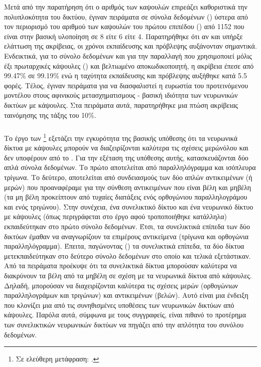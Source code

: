 Μετά από την παρατήρηση ότι ο αριθμός των καψουλών επιρεάζει καθοριστικά την πολυπλοκότητα του δικτύου, έγιναν πειράματα σε σύνολα δεδομένων () ύστερα από τον περιορισμό του αριθμού των καψουλών του πρώτου επιπέδου () από 1152 που είναι στην βασική υλοποίηση σε 8 είτε 6 είτε 4. Παρατηρήθηκε ότι αν και υπήρξε ελάττωση της ακρίβειας, οι χρόνοι εκπαίδευσης και πρόβλεψης αυξάνονταν σημαντικά. Ενδεικτικά, για το σύνολο δεδομένων  και για την παραλλαγή που χρησιμοποιεί μόλις έξι πρωταρχικές κάψουλες () και βελτιωμένο αποκωδικοποιητή, η ακρίβεια έπεσε από 99.47\% σε 99.19\% ενώ η ταχύτητα εκπαίδευσης και πρόβλεψης αυξήθηκε κατά 5.5 φορές. Τέλος, έγιναν πειράματα για να διασφαλιστεί η ευρωστία του προτεινόμενου μοντέλου στους αφινικούς μετασχηματισμους - βασική ιδιότητα των νευρωνικών δικτύων με κάψουλες. Στα πειράματα αυτά, παρατηρήθηκε μια πτώση ακρίβειας ταινόμησης της τάξης του 10\%.

\subsubsection{}

Το έργο των  \footnote{Σε ελεύθερη μετάφραση: .} \cite{manogaran2020capsnet} εξετάζει την εγκυρότητα της βασικής υπόθεσης ότι τα νευρωνικά δίκτυα με κάψουλες μπορούν να διαζειρίζονται καλύτερα τις σχέσεις μερών\textendash όλου και δεν υποφέρουν από το . Για την εξέταση της υπόθεσης αυτής, κατασκευάζονται δύο απλά σύνολα δεδομένων. Το πρώτο αποτελείται από παραλληλόγραμμα και ισόπλευρα τρίγωνα. Το δεύτερο, αποτελείται από συνδειασμούς των δύο απλών αντικειμένων (ή μερών) που προαναφέραμε για την σύνθεση αντικειμένων που είναι βέλη και μη\textendash βέλη (τα μη βέλη προκείπτουν από τυχαίες διατάξεις ενός ορθογώνιου παραλληλογράμου και ενός τριγώνου). Στην συνέχεια, ένα συνελικτικό δίκτυο και ένα νευρωνικό δίκτυο με κάψουλες (όπως περιγράφεται στο έργο \cite{sabour2017dynamic} αφού τροποποιήθηκε κατάλληλα) εκπαιδεύτηκαν στο πρώτο σύνολο δεδομένων. Έτσι, τα συνελικτικά επίπεδα των δύο δικτύων έμαθαν να αναγνωρίζουν τα επιμέρους αντικείμενα (τρίγωνα και ορθογώνια παραλληλόγραμμα). Έπειτα, παγώνοντας () τα συνελικτικά επίπεδα, τα δύο δίκτυα μετεκπαιδεύτηκαν στο δεύτερο σύνολο δεδομένων στο οποίο και τελικά εξετάστικαν. Από τα πειράματα προέκυψε ότι τα συνελικτικά δίκτυα μπορούσαν καλύτερα να διακρύνουν τα βέλη από τα μη\textendash βέλη σε σχέση με τα νευρωνικά δίκτυα από κάψουλες. Δηλαδή, μπορούσαν να διαχειρίζονται καλύτερα τις σχέσεις μερών (ορθογώνιων παραλληλογράμων και τριγώνων) και αντικειμένων (βελών). Αυτό είναι μια ένδειξη που κλονίζει μια από τις συνηθισμένες υποθέσεις των νευρωνικών δικτύων από κάψουλες. Παρόλα αυτά, σύμφωνα με τους συγγραφείς, είναι πιθανό το προτέρημα των συνελικτικών νευρωνικών δικτύων να πηγάζει από την απλότητα του συνόλου δεδομένων.


